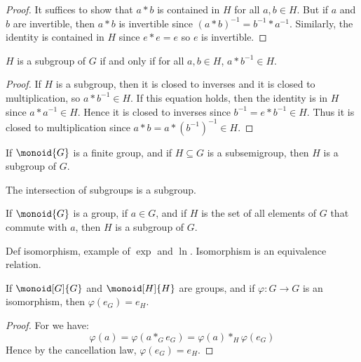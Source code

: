 \documentclass{book}                                                           %
\begin{document}
        \begin{proof}
            It suffices to show that $a*b$ is contained in $H$ for all
            $a,b\in{H}$. But if $a$ and $b$ are invertible, then $a*b$ is
            invertible since
            $(a*b)^{\minus{1}}=b^{\minus{1}}*a^{\minus{1}}$. Similarly, the
            identity is contained in $H$ since $e*e=e$ so $e$ is invertible.
        \end{proof}
        \begin{theorem}
            $H$ is a subgroup of $G$ if and only if for all $a,b\in{H}$,
            $a*b^{\minus{1}}\in{H}$.
        \end{theorem}
        \begin{proof}
            If $H$ is a subgroup, then it is closed to inverses and it is
            closed to multiplication, so $a*b^{\minus{1}}\in{H}$. If this
            equation holds, then the identity is in $H$ since
            $a*a^{\minus{1}}\in{H}$. Hence it is closed to inverses since
            $b^{\minus{1}}=e*b^{\minus{1}}\in{H}$. Thus it is closed to
            multiplication since $a*b=a*(b^{\minus{1}})^{\minus{1}}\in{H}$.
        \end{proof}
        \begin{theorem}
            If $\monoid{G}$ is a finite group, and if $H\subseteq{G}$ is a
            subsemigroup, then $H$ is a subgroup of $G$.
        \end{theorem}
        \begin{theorem}
            The intersection of subgroups is a subgroup.
        \end{theorem}
        \begin{theorem}
            If $\monoid{G}$ is a group, if $a\in{G}$, and if $H$ is the set
            of all elements of $G$ that commute with $a$, then $H$ is a
            subgroup of $G$.
        \end{theorem}
        Def isomorphism, example of $\exp$ and $\ln$. Isomorphism is an
        equivalence relation.
        \begin{theorem}
            If $\monoid[G]{G}$ and $\monoid[H]{H}$ are groups, and if
            $\varphi:G\rightarrow{G}$ is an isomorphism, then
            $\varphi(e_{G})=e_{H}$.
        \end{theorem}
        \begin{proof}
            For we have:
            \begin{equation}
                \varphi(a)=\varphi(a*_{G}e_{G})
                          =\varphi(a)*_{H}\varphi(e_{G})
            \end{equation}
            Hence by the cancellation law, $\varphi(e_{G})=e_{H}$.
        \end{proof}
\end{document}
